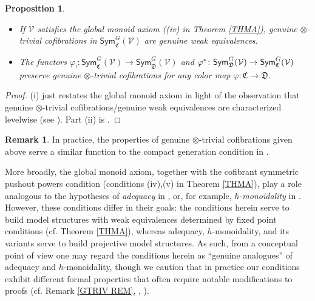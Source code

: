 \documentclass[a4paper,10pt
 ,final
]{article}%
\numberwithin{equation}{section}
\numberwithin{figure}{section}
\newtheorem{proposition}[equation]{Proposition}%
\theoremstyle{definition} %
\newtheorem{remark}[equation]{Remark}%
\newcommand{\V}{\ensuremath{\mathcal V}}
\newcommand{\1}{\ensuremath{\mathbbm 1}}%
\begin{document}
\begin{proposition}\label{GOTC_PROP}
	\begin{itemize}
		\item [(i)] 
		If $\V$ satisfies the global monoid axiom
		((iv) in Theorem \ref{THMA}),
		genuine $\otimes$-trivial cofibrations
		in $\mathsf{Sym}^G_{\mathfrak C}(\V)$
		are genuine weak equivalences.
		\item[(ii)]
		The functors
		$\varphi_! \colon 
		\mathsf{Sym}^G_{\mathfrak C}(\V)
		\to 
		\mathsf{Sym}^G_{\mathfrak D}(\V)$
		and
		$\varphi^{\**} \colon 
		\mathsf{Sym}^G_{\mathfrak D}(\V)
		\to 
		\mathsf{Sym}^G_{\mathfrak C}(\V)$
		preserve genuine $\otimes$-trivial cofibrations
		for any color map
		$\varphi \colon \mathfrak{C} \to \mathfrak{D}$.
	\end{itemize}
\end{proposition}

\begin{proof}
	(i) just restates the global monoid axiom
	\cite[Def. \ref{OC-GLOBMONAX_DEF}]{BP_FCOP} in light of the observation that genuine $\otimes$-trivial cofibrations/genuine weak equivalences 
	are characterized levelwise (see
	\cite[Rem. \ref{OC-SIGMACOF_REM}, Def. \ref{OC-GGENOTITC DEF}]{BP_FCOP}).
	Part (ii) is \cite[Prop. \ref{OC-REGEOTCOF PROP}]{BP_FCOP}.
\end{proof}


\begin{remark}
        \label{GOTC_REM2}
	In practice, 
	the properties of genuine $\otimes$-trivial cofibrations
	given above
	serve a similar function to the compact generation condition
	in \cite[Def. 1.2]{BM13}.

    More broadly, the global monoid axiom, together with the cofibrant symmetric pushout powers condition
    (conditions (iv),(v) in Theorem \ref{THMA}),
    play a role analogous to the hypotheses of \textit{adequacy} in \cite[Prop. 1.4]{BM13},
    or, for example,
    \textit{$h$-monoidality} in \cite{BB17}.
	However, these conditions differ in their goals:
	the conditions herein serve to build model structures 
	with weak equivalences determined by fixed point conditions (cf. Theorem \ref{THMA}),
	whereas adequacy, $h$-monoidality, and its variants serve to build projective model structures.
	As such, from a conceptual point of view one may regard the conditions herein as ``genuine analogues'' of adequacy and $h$-monoidality,
	though we caution that in practice
	our conditions exhibit different formal properties
	that often require notable modifications to proofs
	(cf. Remark \ref{GTRIV REM}, \cite[Rem. 6.18]{BP_geo}, \cite[Rem. 4.8]{BP_FCOP}).
\end{remark}
\end{document}
